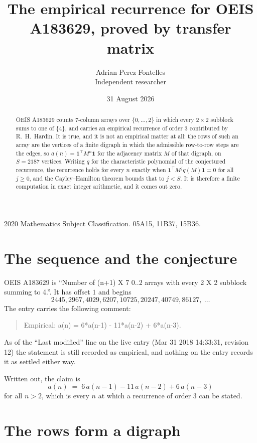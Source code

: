 \documentclass[11pt,a4paper]{article}
\title{The empirical recurrence for OEIS A183629, proved by transfer matrix}
\author{Adrian Perez Fontelles\\ \small Independent researcher}
\date{31 August 2026}
\theoremstyle{plain}
\theoremstyle{definition}
\begin{document}
\maketitle

\begin{abstract}
OEIS A183629 counts $7$-column arrays over $\{0,\dots,2\}$ in which every
$2\times2$ subblock sums to one of $\{4\}$, and carries an empirical
recurrence of order $3$ contributed by R.~H.~Hardin. It is true, and it is not an
empirical matter at all: the rows of such an array are the vertices of a finite digraph in
which the admissible row-to-row steps are the edges, so $a(n)=\mathbf{1}^{\!\top}M^{n}
\mathbf{1}$ for the adjacency matrix $M$ of that digraph, on $S=2187$ vertices. Writing
$q$ for the characteristic polynomial of the conjectured recurrence, the recurrence holds
for every $n$ exactly when $\mathbf{1}^{\!\top}M^{j}q(M)\mathbf{1}=0$ for all
$j\ge0$, and the Cayley--Hamilton theorem bounds that to $j<S$. It is therefore a finite
computation in exact integer arithmetic, and it comes out zero.
\end{abstract}

\noindent\small 2020 Mathematics Subject Classification. 05A15, 11B37, 15B36.\normalsize

\section{The sequence and the conjecture}

OEIS A183629 is ``Number of (n+1) X 7 0..2 arrays with every 2 X 2 subblock summing to 4.''. It has offset $1$
and begins
\[
2445, 2967, 4029, 6207, 10725, 20247, 40749, 86127,\ \dots
\]
The entry carries the following comment:
\begin{quote}\small
Empirical: a(n) = 6*a(n-1) - 11*a(n-2) + 6*a(n-3).
\end{quote}
As of the ``Last modified'' line on the live entry (Mar 31 2018 14:33:31, revision 12) the statement is
still recorded as empirical, and nothing on the entry records it as settled either way.

Written out, the claim is
\begin{equation}\label{eq:conj}
a(n)\;=\;6\,a(n-1) - 11\,a(n-2) + 6\,a(n-3)
\end{equation}
for all $n>2$, which is every $n$ at which a recurrence of order $3$ can be
stated.

\section{The rows form a digraph}
\end{document}
